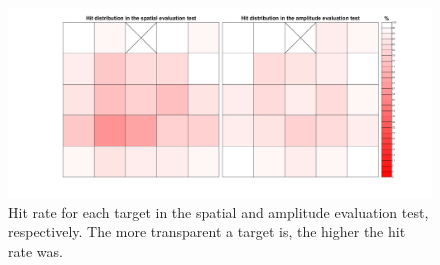 \begin{figure}[H]                 
	\includegraphics[width=1\textwidth]{figures/hit_dist}
	\caption{Hit rate for each target in the spatial and amplitude evaluation test, respectively. The more transparent a target is, the higher the hit rate was.}
	\label{fig:pa:hit_dist} 
\end{figure}